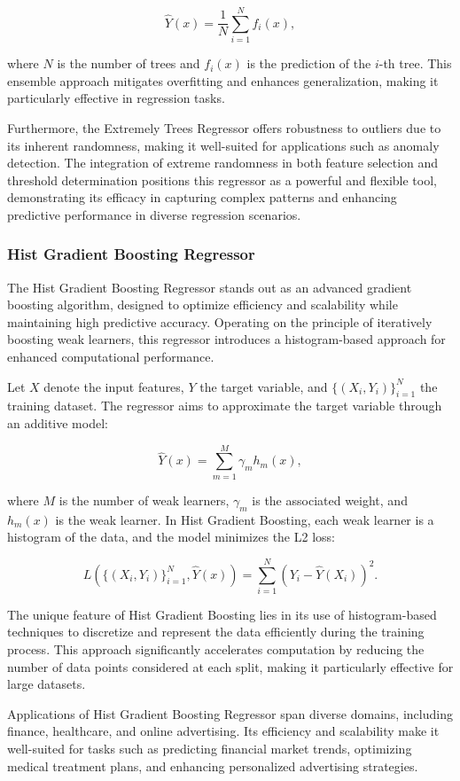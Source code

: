 \documentclass[twocolumn]{article}
\begin{document}
\[ \hat{Y}(x) = \frac{1}{N} \sum_{i=1}^{N} f_i(x), \]

where \(N\) is the number of trees and \(f_i(x)\) is the prediction of the \(i\)-th tree. This ensemble approach mitigates overfitting and enhances generalization, making it particularly effective in regression tasks.

Furthermore, the Extremely Trees Regressor offers robustness to outliers due to its inherent randomness, making it well-suited for applications such as anomaly detection. The integration of extreme randomness in both feature selection and threshold determination positions this regressor as a powerful and flexible tool, demonstrating its efficacy in capturing complex patterns and enhancing predictive performance in diverse regression scenarios.

		\subsubsection{Hist Gradient Boosting Regressor}
The Hist Gradient Boosting Regressor stands out as an advanced gradient boosting algorithm, designed to optimize efficiency and scalability while maintaining high predictive accuracy. Operating on the principle of iteratively boosting weak learners, this regressor introduces a histogram-based approach for enhanced computational performance.

Let \(X\) denote the input features, \(Y\) the target variable, and \(\{ (X_i, Y_i) \}_{i=1}^{N}\) the training dataset. The regressor aims to approximate the target variable through an additive model:

\[ \hat{Y}(x) = \sum_{m=1}^{M} \gamma_m h_m(x), \]

where \(M\) is the number of weak learners, \(\gamma_m\) is the associated weight, and \(h_m(x)\) is the weak learner. In Hist Gradient Boosting, each weak learner is a histogram of the data, and the model minimizes the L2 loss:

\[ L(\{ (X_i, Y_i) \}_{i=1}^{N}, \hat{Y}(x)) = \sum_{i=1}^{N} (Y_i - \hat{Y}(X_i))^2. \]

The unique feature of Hist Gradient Boosting lies in its use of histogram-based techniques to discretize and represent the data efficiently during the training process. This approach significantly accelerates computation by reducing the number of data points considered at each split, making it particularly effective for large datasets.

Applications of Hist Gradient Boosting Regressor span diverse domains, including finance, healthcare, and online advertising. Its efficiency and scalability make it well-suited for tasks such as predicting financial market trends, optimizing medical treatment plans, and enhancing personalized advertising strategies.
\end{document}
